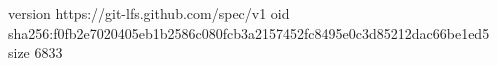 version https://git-lfs.github.com/spec/v1
oid sha256:f0fb2e7020405eb1b2586c080fcb3a2157452fc8495e0c3d85212dac66be1ed5
size 6833
